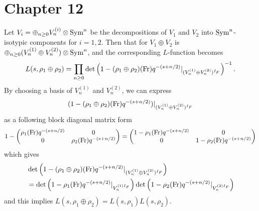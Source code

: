 \newpage
\section{Chapter 12}

\begin{problem} \notfinish
\end{problem}

\begin{problem} \notfinish
\end{problem}

\begin{problem} \notfinish
\end{problem}

\begin{problem} \notfinish
\end{problem}

\begin{problem} \notfinish
\end{problem}

\begin{problem} \notfinish
\end{problem}

\begin{problem}
Let $V_i = \oplus_{n \geq 0} V_{n}^{(i)} \otimes \operatorname{\mathrm{Sym}}^{n}$ be the decompositions of $V_1$ and $V_2$
into $\operatorname{\mathrm{Sym}}^n$-isotypic components for $i = 1, 2$.
Then that for $V_1 \oplus V_2$ is $\oplus_{n \geq 0} (V_n^{(1)} \oplus V_n^{(2)}) \otimes \operatorname{\mathrm{Sym}}^n$, and the
corresponding $L$-function becomes
$$
L(s, \rho_1 \oplus \rho_2) = \prod_{n \geq 0} \det\left(1 - (\rho_1 \oplus \rho_2)(\operatorname{\mathrm{Fr}})q^{-(s + n/2)}|_{(V_{n}^{(1)} \oplus V_{n}^{(2)})^{I_F}}\right)^{-1}.
$$
By choosing a basis of $V_n^{(1)}$ and $V_n^{(2)}$, we can express 
$$
(1 - (\rho_1 \oplus \rho_2)(\operatorname{\mathrm{Fr}})q^{-(s+n/2)})|_{(V_n^{(1)} \oplus V_{n}^{(2)})^{I_F}}
$$
as a following block diagonal matrix form
$$
1 - \begin{pmatrix}
    \rho_1(\operatorname{\mathrm{Fr}}) q^{-(s+n/2)} & 0 \\ 0 & \rho_2(\operatorname{\mathrm{Fr}}) q^{-(s+n/2)}
\end{pmatrix}
= \begin{pmatrix}
    1 - \rho_1(\operatorname{\mathrm{Fr}}) q^{-(s+n/2)} & 0 \\ 0 & 1 - \rho_2(\operatorname{\mathrm{Fr}}) q^{-(s+n/2)}
\end{pmatrix}
$$
which gives
\begin{align*}
&\det \left(1 - (\rho_1 \oplus \rho_2)(\operatorname{\mathrm{Fr}})q^{-(s+n/2)}|_{(V_n^{(1)} \oplus V_{n}^{(2)})^{I_F}}\right) \\
&= \det\left(1 - \rho_1(\operatorname{\mathrm{Fr}})q^{-(s + n/2)}|_{V_{n}^{(1)I_F}}\right) \det\left(1 - \rho_2(\operatorname{\mathrm{Fr}})q^{-(s + n/2)}|_{V_{n}^{(2)I_F}}\right)
\end{align*}
and this implies $L(s, \rho_1 \oplus \rho_2) = L(s, \rho_1) L(s, \rho_2)$.
\end{problem}

